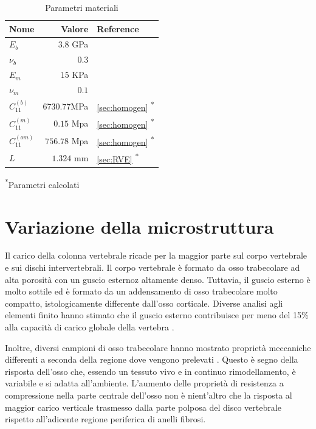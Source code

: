 \documentclass[a4paper,num-refs]{oup-contemporary}
\begin{document}
\begin{table}[bt!]
	\caption{Parametri materiali}\label{tab:example}
	\begin{tabular}{l r l}
		\toprule
		Nome & Valore &  Reference\\
		\midrule
		$E_b$ & $3.8$ GPa & \citet{Cowin1}  \\
		$\nu_b$  & $0.3$ & \citet{Dalstra:93,Wirtz:2000}  \\
		$E_m$  & $15$ KPa  & \citet{Jansen:2015} \\ 
		$\nu_m$ & $0.1 $&    \\
		
		$C_{11}^{(b)}$&$6730.77 $MPa& \cref{sec:homogen} \textsuperscript{*}\\
		$C_{11}^{(m)}$& $0.15$ Mpa& \cref{sec:homogen} \textsuperscript{*}\\
		$C_{11}^{(om)}$& $756.78 $ Mpa & \cref{sec:homogen} \textsuperscript{*}\\
		$L$ & $1.324$ mm& \cref{sec:RVE} \textsuperscript{*}\\
		\bottomrule
	\end{tabular}
	\begin{tablenotes}
		
		\item \textsuperscript{*}Parametri calcolati
	\end{tablenotes}
\end{table}


\section{Variazione della microstruttura}

Il carico della colonna vertebrale ricade per la maggior parte sul corpo vertebrale e sui dischi intervertebrali. Il corpo vertebrale è formato da osso trabecolare ad alta porosità con un guscio esternoz altamente denso. Tuttavia, il guscio esterno è molto sottile ed è formato da un addensamento di osso trabecolare molto compatto, istologicamente differente dall'osso corticale. Diverse analisi agli elementi finito hanno stimato che il guscio esterno contribuisce per meno del 15\% alla capacità di carico globale della vertebra \citep{Ferguson:2003, Silva:1997}.

Inoltre, diversi campioni di osso trabecolare hanno mostrato  proprietà meccaniche differenti a seconda della regione dove vengono prelevati \citep{Keller:1989,Keller:1993}. Questo è segno della risposta dell'osso che, essendo un tessuto vivo e in continuo rimodellamento, è variabile e si adatta all'ambiente. L'aumento delle proprietà di resistenza a compressione nella parte centrale dell'osso non è nient'altro che la risposta al maggior carico verticale trasmesso dalla parte polposa del disco vertebrale rispetto all'adicente regione periferica di anelli fibrosi. 
\end{document}
